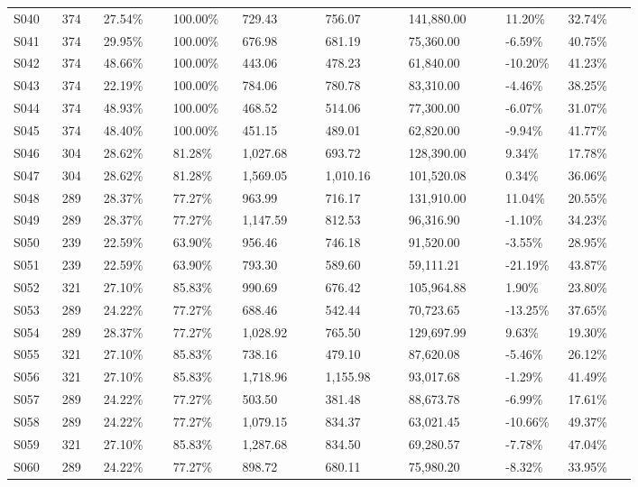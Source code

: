 \begin{longtable}{@{}p{0.07\linewidth}p{0.06\linewidth}p{0.1\linewidth}p{0.1\linewidth}p{0.12\linewidth}p{0.12\linewidth}p{0.14\linewidth}p{0.09\linewidth}p{0.1\linewidth}@{}}
S040 & 374 & 27.54\% & 100.00\% & 729.43 & 756.07 & 141,880.00 & 11.20\% & 32.74\% \\
S041 & 374 & 29.95\% & 100.00\% & 676.98 & 681.19 & 75,360.00 & -6.59\% & 40.75\% \\
S042 & 374 & 48.66\% & 100.00\% & 443.06 & 478.23 & 61,840.00 & -10.20\% & 41.23\% \\
S043 & 374 & 22.19\% & 100.00\% & 784.06 & 780.78 & 83,310.00 & -4.46\% & 38.25\% \\
S044 & 374 & 48.93\% & 100.00\% & 468.52 & 514.06 & 77,300.00 & -6.07\% & 31.07\% \\
S045 & 374 & 48.40\% & 100.00\% & 451.15 & 489.01 & 62,820.00 & -9.94\% & 41.77\% \\
S046 & 304 & 28.62\% & 81.28\% & 1,027.68 & 693.72 & 128,390.00 & 9.34\% & 17.78\% \\
S047 & 304 & 28.62\% & 81.28\% & 1,569.05 & 1,010.16 & 101,520.08 & 0.34\% & 36.06\% \\
S048 & 289 & 28.37\% & 77.27\% & 963.99 & 716.17 & 131,910.00 & 11.04\% & 20.55\% \\
S049 & 289 & 28.37\% & 77.27\% & 1,147.59 & 812.53 & 96,316.90 & -1.10\% & 34.23\% \\
S050 & 239 & 22.59\% & 63.90\% & 956.46 & 746.18 & 91,520.00 & -3.55\% & 28.95\% \\
S051 & 239 & 22.59\% & 63.90\% & 793.30 & 589.60 & 59,111.21 & -21.19\% & 43.87\% \\
S052 & 321 & 27.10\% & 85.83\% & 990.69 & 676.42 & 105,964.88 & 1.90\% & 23.80\% \\
S053 & 289 & 24.22\% & 77.27\% & 688.46 & 542.44 & 70,723.65 & -13.25\% & 37.65\% \\
S054 & 289 & 28.37\% & 77.27\% & 1,028.92 & 765.50 & 129,697.99 & 9.63\% & 19.30\% \\
S055 & 321 & 27.10\% & 85.83\% & 738.16 & 479.10 & 87,620.08 & -5.46\% & 26.12\% \\
S056 & 321 & 27.10\% & 85.83\% & 1,718.96 & 1,155.98 & 93,017.68 & -1.29\% & 41.49\% \\
S057 & 289 & 24.22\% & 77.27\% & 503.50 & 381.48 & 88,673.78 & -6.99\% & 17.61\% \\
S058 & 289 & 24.22\% & 77.27\% & 1,079.15 & 834.37 & 63,021.45 & -10.66\% & 49.37\% \\
S059 & 321 & 27.10\% & 85.83\% & 1,287.68 & 834.50 & 69,280.57 & -7.78\% & 47.04\% \\
S060 & 289 & 24.22\% & 77.27\% & 898.72 & 680.11 & 75,980.20 & -8.32\% & 33.95\% \\

\end{longtable}
